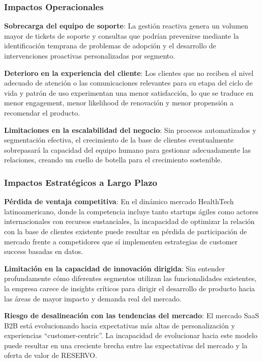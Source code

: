 \subsubsection{Impactos Operacionales}

\textbf{Sobrecarga del equipo de soporte}: La gestión reactiva genera un volumen mayor de tickets de soporte y consultas que podrían prevenirse mediante la identificación temprana de problemas de adopción y el desarrollo de intervenciones proactivas personalizadas por segmento.

\textbf{Deterioro en la experiencia del cliente}: Los clientes que no reciben el nivel adecuado de atención o las comunicaciones relevantes para su etapa del ciclo de vida y patrón de uso experimentan una menor satisfacción, lo que se traduce en menor engagement, menor likelihood de renovación y menor propensión a recomendar el producto.

\textbf{Limitaciones en la escalabilidad del negocio}: Sin procesos automatizados y segmentación efectiva, el crecimiento de la base de clientes eventualmente sobrepasará la capacidad del equipo humano para gestionar adecuadamente las relaciones, creando un cuello de botella para el crecimiento sostenible.

\subsubsection{Impactos Estratégicos a Largo Plazo}

\textbf{Pérdida de ventaja competitiva}: En el dinámico mercado HealthTech latinoamericano, donde la competencia incluye tanto startups ágiles como actores internacionales con recursos sustanciales, la incapacidad de optimizar la relación con la base de clientes existente puede resultar en pérdida de participación de mercado frente a competidores que sí implementen estrategias de customer success basadas en datos.

\textbf{Limitación en la capacidad de innovación dirigida}: Sin entender profundamente cómo diferentes segmentos utilizan las funcionalidades existentes, la empresa carece de insights críticos para dirigir el desarrollo de producto hacia las áreas de mayor impacto y demanda real del mercado.

\textbf{Riesgo de desalineación con las tendencias del mercado}: El mercado SaaS B2B está evolucionando hacia expectativas más altas de personalización y experiencias ``customer-centric''. La incapacidad de evolucionar hacia este modelo puede resultar en una creciente brecha entre las expectativas del mercado y la oferta de valor de RESERVO.



